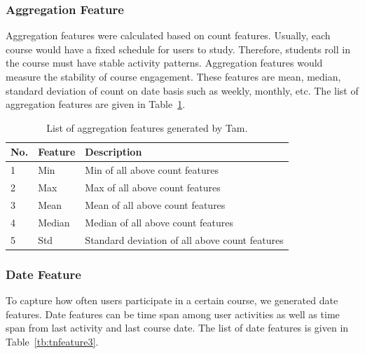 \subsubsection{Aggregation Feature}
Aggregation features were calculated based on count features. Usually, each course would have a fixed schedule for users to study. Therefore, students roll in the course must have stable activity patterns. Aggregation features would measure the stability of course engagement. These features are mean, median, standard deviation of count on date basis such as weekly, monthly, etc. The list of aggregation features are given in Table~\ref{tb:tnfeature2}.

\begin{center}
	\begin{table}[ht]
		\begin{minipage}{\textwidth}
			{
				\small
				\hfill{}
				\begin{tabular}{|l|l|l|}
					\hline
					\textbf{No.}&\textbf{Feature}&\textbf{Description}\tabularnewline \hline
					1 & Min & Min of all above count features \tabularnewline
					2 & Max & Max of all above count features \tabularnewline
					3 & Mean & Mean of all above count features \tabularnewline
					4 & Median & Median of all above count features \tabularnewline
					5 & Std & Standard deviation of all above count features  \tabularnewline
					\hline
				\end{tabular}
			}
			\hfill{}
			\caption{List of aggregation features generated by Tam.}
			\label{tb:tnfeature2}
		\end{minipage}
	\end{table}
\end{center}

\subsubsection{Date Feature}
To capture how often users participate in a certain course, we generated date features. Date features can be time span among user activities as well as time span from last activity and last course date. The list of date features is given in Table~\ref{tb:tnfeature3}.

